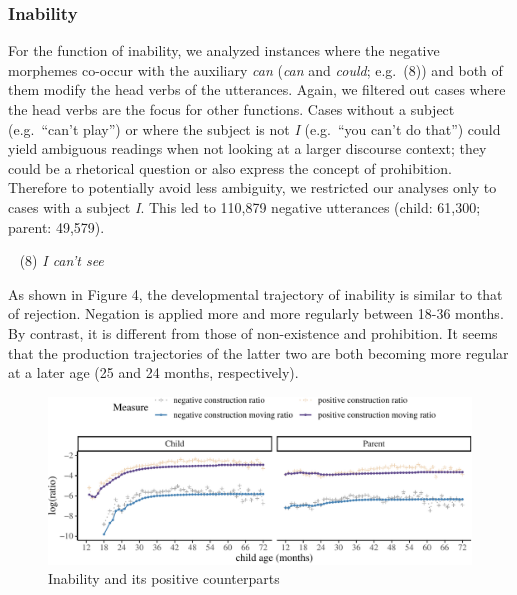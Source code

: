 \documentclass[
  english,
  man,floatsintext]{apa6}
\begin{document}
\clearpage

\hypertarget{inability}{%
\subsubsection{Inability}\label{inability}}

For the function of inability, we analyzed instances where the negative morphemes co-occur with the auxiliary \emph{can} (\emph{can} and \emph{could}; e.g.~(8)) and both of them modify the head verbs of the utterances. Again, we filtered out cases where the head verbs are the focus for other functions. Cases without a subject (e.g.~\enquote{can't play}) or where the subject is not \emph{I} (e.g.~\enquote{you can't do that}) could yield ambiguous readings when not looking at a larger discourse context; they could be a rhetorical question or also express the concept of prohibition. Therefore to potentially avoid less ambiguity, we restricted our analyses only to cases with a subject \emph{I}. This led to 110,879 negative utterances (child: 61,300; parent: 49,579).

~
(8) \emph{I can't see}

As shown in Figure 4, the developmental trajectory of inability is similar to that of rejection. Negation is applied more and more regularly between 18-36 months. By contrast, it is different from those of non-existence and prohibition. It seems that the production trajectories of the latter two are both becoming more regular at a later age (25 and 24 months, respectively).

\begin{figure}[H]

{\centering \includegraphics{neg_construction_article_files/figure-latex/inability-1} 

}

\caption{Inability and its positive counterparts}\label{fig:inability}
\end{figure}
\end{document}
